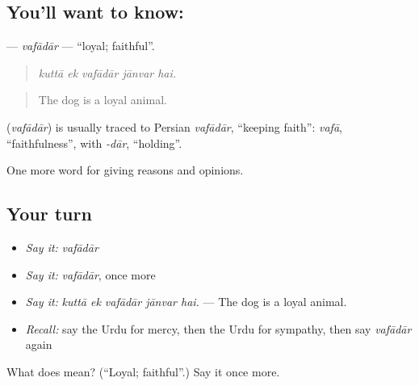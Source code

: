 \subsection*{You'll want to know: }
\textbf{} — \emph{vafādār} — \textquotedblleft{}loyal; faithful\textquotedblright{}.

\begin{quote}
    
\end{quote}

\begin{quote}
\emph{kuttā ek vafādār jānvar hai.}
\end{quote}

\begin{quote}
The dog is a loyal animal.
\end{quote}

\begin{cousinweb}
\textbf{} (\emph{vafādār}) is usually traced to Persian \emph{vafādār}, \textquotedblleft{}keeping faith\textquotedblright{}: \emph{vafā}, \textquotedblleft{}faithfulness\textquotedblright{}, with \emph{-dār}, \textquotedblleft{}holding\textquotedblright{}.
\end{cousinweb}

\begin{grammarlens}[title={What you've built}]
One more word for giving reasons and opinions.
\end{grammarlens}

\subsection*{Your turn}
\begin{itemize}
\raggedright
  \item \emph{Say it:} \emph{vafādār}
  \item \emph{Say it:} \emph{vafādār}, once more
  \item \emph{Say it:} \emph{kuttā ek vafādār jānvar hai.} — The dog is a loyal animal.
  \item \emph{Recall:} say the Urdu for mercy, then the Urdu for sympathy, then say \emph{vafādār} again
\end{itemize}

\begin{tcolorbox}[breakable,colback=teal!4,colframe=teal!35!black,title={Before you move on}]
What does  mean? (\textquotedblleft{}Loyal; faithful\textquotedblright{}.) Say it once more.
\end{tcolorbox}
